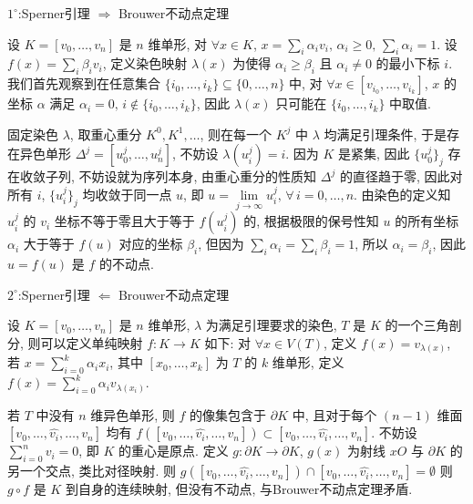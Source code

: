     $1^{\circ}$:Sperner引理 $\Rightarrow$ Brouwer不动点定理
    
    设 $K = [v_0,\dots,v_n]$ 是 $n$ 维单形, 对 $\forall x\in K$, $x=\sum_i\alpha_iv_i,\,\alpha_i\geqslant0,\,\sum_i\alpha_i=1$. 设 $f(x) = \sum_i\beta_iv_i$, 定义染色映射 
    $\lambda(x)$ 为使得 $\alpha_i\geqslant\beta_i$ 且 $\alpha_i\neq0$ 的最小下标 $i$. 我们首先观察到在任意集合 $\{i_0,\dots,i_k\}\subseteq\{0,\dots,n\}$ 中, 
    对 $\forall x\in[v_{i_0},\dots,v_{i_k}]$, $x$ 的坐标 $\alpha$ 满足 $\alpha_i=0,\,i\notin\{i_0,\dots,i_k\}$, 因此 $\lambda(x)$ 只可能在 $\{i_0,\dots,i_k\}$ 中取值.

    固定染色 $\lambda$, 取重心重分 $K^0,K^1,\dots$, 则在每一个 $K^j$ 中 $\lambda$ 均满足引理条件, 于是存在异色单形 $\Delta^j=[u^j_0,\dots,u^j_n]$, 不妨设 $\lambda(u^j_i)=i$.
    因为 $K$ 是紧集, 因此 $\{u^j_0\}_j$ 存在收敛子列, 不妨设就为序列本身, 由重心重分的性质知 $\Delta^j$ 的直径趋于零, 因此对所有 $i$, $\{u^j_i\}_j$ 均收敛于同一点 $u$, 即 
    $u=\lim\limits_{j\rightarrow\infty}u^j_i,\,\forall\,i=0,\dots,n$. 由染色的定义知 $u^j_i$ 的 $v_i$ 坐标不等于零且大于等于 $f(u^j_i)$ 的, 
    根据极限的保号性知 $u$ 的所有坐标 $\alpha_i$ 大于等于 $f(u)$ 对应的坐标 $\beta_i$, 但因为 $\sum_i\alpha_i = \sum_i\beta_i = 1$, 所以 $\alpha_i=\beta_i$, 因此 $u = f(u)$ 是 $f$ 的不动点.

    $2^{\circ}$:Sperner引理 $\Leftarrow$ Brouwer不动点定理
    
    设 $K = [v_0,\dots,v_n]$ 是 $n$ 维单形, $\lambda$ 为满足引理要求的染色, $T$ 是 $K$ 的一个三角剖分, 则可以定义单纯映射 $f:K\rightarrow K$ 如下: 对 $\forall x\in V(T)$, 
    定义 $f(x) = v_{\lambda(x)}$, 若 $x = \sum_{i=0}^{k}\alpha_ix_i$, 其中 $[x_0,\dots,x_k]$ 为 $T$ 的 $k$ 维单形, 定义 $f(x) = \sum_{i=0}^{k}\alpha_iv_{\lambda(x_i)}$.

    若 $T$ 中没有 $n$ 维异色单形, 则 $f$ 的像集包含于 $\partial K$ 中, 且对于每个 $(n-1)$ 维面 $[v_0,\dots,\hat{v_i},\dots,v_n]$ 均有 $f([v_0,\dots,\hat{v_i},\dots,v_n])\subset[v_0,\dots,\hat{v_i},\dots,v_n]$.
    不妨设 $\sum_{i=0}^{n}v_i = 0$, 即 $K$ 的重心是原点. 定义 $g:\partial K\rightarrow \partial K$, $g(x)$ 为射线 $xO$ 与 $\partial K$ 的另一个交点, 类比对径映射. 则 $g([v_0,\dots,\hat{v_i},\dots,v_n])\cap[v_0,\dots,\hat{v_i},\dots,v_n]=\emptyset$
    则 $g\circ f$ 是 $K$ 到自身的连续映射, 但没有不动点, 与Brouwer不动点定理矛盾.

